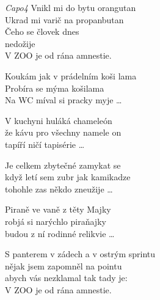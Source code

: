 \re{}\textit {Capo4}
 \ve
{}Vnikl mi do bytu orangutan\\
  Ukrad mi varič na propanbutan\\
   {Č}eho se človek dnes\\
  nedožije\\
V ZOO je od rána amnestie.

\ve
Koukám jak v prádelním koši lama\\
  Probíra se mýma košilama\\
  Na WC míval si pracky myje …

\ve
V kuchyni huláká chameleón\\
  že kávu pro všechny namele on\\
  tapíří ničí tapisérie …

\ve
Je celkem zbytečné zamykat se\\
  když letí sem zubr jak kamikadze\\
  tohohle zas někdo zneužije …

\ve
 Piraně ve vaně z těty Majky\\
  robjá si narýchlo piraňajky\\
  budou z ní rodinné relikvie …

\ve
S panterem v zádech a v ostrým sprintu\\
  nějak jsem zapomněl na pointu\\
  abych vás nezklamal tak tady je:\\
  V ZOO je od rána amnestie.

\esong